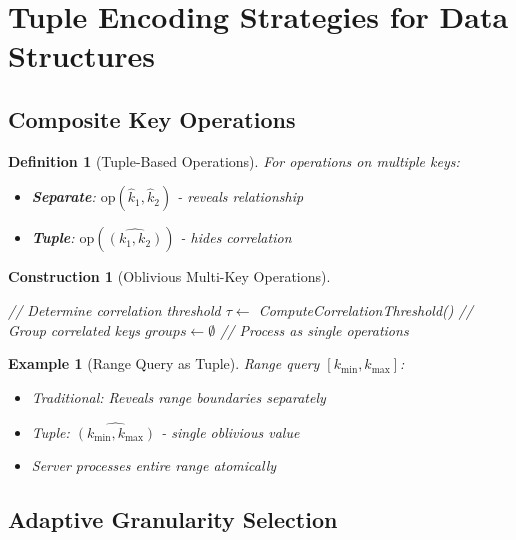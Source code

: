 \documentclass[11pt,final,hidelinks]{article}
\newtheorem{definition}[theorem]{Definition}
\newtheorem{example}[theorem]{Example}
\newtheorem{construction}[theorem]{Construction}
\begin{document}
\section{Tuple Encoding Strategies for Data Structures}

\subsection{Composite Key Operations}

\begin{definition}[Tuple-Based Operations]
For operations on multiple keys:
\begin{itemize}
    \item \textbf{Separate}: $\text{op}(\hat{k}_1, \hat{k}_2)$ - reveals relationship
    \item \textbf{Tuple}: $\text{op}(\widehat{(k_1, k_2)})$ - hides correlation
\end{itemize}
\end{definition}

\begin{construction}[Oblivious Multi-Key Operations]
\begin{algorithm}[H]
\caption{Tuple-Based Batch Operations}
// Determine correlation threshold\;
$\tau \gets$ ComputeCorrelationThreshold()\;
// Group correlated keys\;
$groups \gets \emptyset$\;
// Process as single operations\;
\end{algorithm}
\end{construction}

\begin{example}[Range Query as Tuple]
Range query $[k_{\min}, k_{\max}]$:
\begin{itemize}
    \item Traditional: Reveals range boundaries separately
    \item Tuple: $\widehat{(k_{\min}, k_{\max})}$ - single oblivious value
    \item Server processes entire range atomically
\end{itemize}
\end{example}

\subsection{Adaptive Granularity Selection}
\end{document}
